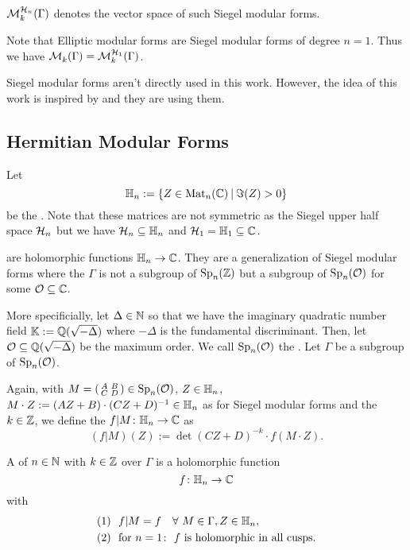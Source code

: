 $\operatorname{\mathcal{M}}^{\mathcal{H}_{n}}_{k} (\Gamma)$ denotes the vector space of such Siegel modular forms.

Note that Elliptic modular forms are Siegel modular forms of degree $n=1$. Thus we have $\operatorname{\mathcal{M}}^{}_{k} (\Gamma) = \operatorname{\mathcal{M}}^{\mathcal{H}_{1}}_{k} (\Gamma)$.

Siegel modular forms aren't directly used in this work. However, the idea of this work is inspired by \cite{PoorYuen07Comp} and they are using them.


\subsection{Hermitian Modular Forms}

Let
\[ \HalfPlane_n :=  \Set{ Z \in \M_n(\C) }{ \Im(Z) > 0} \]
be the . Note that these matrices are not symmetric as the Siegel upper half space $\mathcal{H}_n$ but we have $\mathcal{H}_n \subseteq \mathbb{H}_n$ and $\mathcal{H}_1 = \mathbb{H}_1 \subseteq \mathbb{C}$.

 are holomorphic functions $\mathbb{H}_n \rightarrow \mathbb{C}$. They are a generalization of Siegel modular forms where the  $\Gamma$ is not a subgroup of $\operatorname{Sp}_n(\mathbb{Z})$ but a subgroup of $\operatorname{Sp}_n(\mathcal{O})$ for some $\mathcal{O} \subseteq \mathbb{C}$.


More specificially,
let $\Delta \in \mathbb{N}$ so that we have the imaginary quadratic number field $\mathbb{K} := \mathbb{Q}(\sqrt{-\Delta})$ where $-\Delta$ is the fundamental discriminant.
Then, let $\mathcal{O} \subseteq \mathbb{Q}(\sqrt{-\Delta})$ be the maximum order.
We call $\operatorname{Sp}_n(\mathcal{O})$ the .
Let $\Gamma$ be a subgroup of $\operatorname{Sp}_n(\mathcal{O})$.

Again, with $M = \left( \begin{smallmatrix} A & B \\ C & D \end{smallmatrix} \right) \in \operatorname{Sp}_n(\mathcal{O})$, $Z \in \mathbb{H}_n$, $M \cdot Z := (A Z + B) \cdot (C Z + D)^{-1} \in \mathbb{H}_n$ as for Siegel modular forms and the  $k \in \mathbb{Z}$, we define the  $f | M \colon \mathbb{H}_n \rightarrow \mathbb{C}$ as
\[ (f|M) (Z) := \det(CZ + D)^{-k} \cdot f(M \cdot Z) .\]

A 
of  $n\in\mathbb{N}$
with  $k\in \mathbb{Z}$
over $\Gamma$
is a holomorphic function
\[ f \colon \mathbb{H}_n \rightarrow \mathbb{C} \]
with
\begin{align*}
(1) \ \ & f | M = f \quad\forall\ M \in \Gamma, Z \in \mathbb{H}_n , \\
(2) \ \ & \text{for } n = 1 \colon \ \text{$f$ is holomorphic in all cusps} .
\end{align*}

